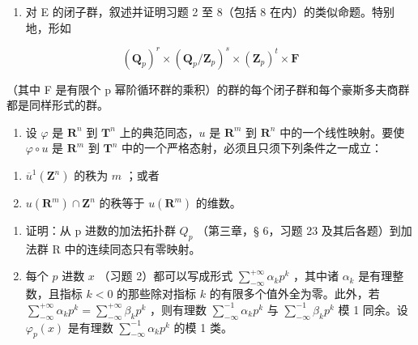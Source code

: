 \begin{enumerate}
\def\labelenumi{\alph{enumi})}
\setcounter{enumi}{6}
\tightlist
\item
  对 E 的闭子群，叙述并证明习题 2 至 8（包括 8 在内）的类似命题。特别地，形如
\end{enumerate}

\[
(\mathbf {Q} _ {p}) ^ {r} \times (\mathbf {Q} _ {p} / \mathbf {Z} _ {p}) ^ {s} \times (\mathbf {Z} _ {p}) ^ {t} \times \mathbf {F}
\]

（其中 F 是有限个 p 幂阶循环群的乘积）的群的每个闭子群和每个豪斯多夫商群都是同样形式的群。

\ExerciseSection

\begin{enumerate}
\def\labelenumi{\arabic{enumi})}
\tightlist
\item
  设 \(\varphi\) 是 \(\mathbf{R}^n\) 到 \(\mathbf{T}^n\) 上的典范同态，\(u\) 是 \(\mathbf{R}^m\) 到 \(\mathbf{R}^n\) 中的一个线性映射。要使 \(\varphi \circ u\) 是 \(\mathbf{R}^m\) 到 \(\mathbf{T}^n\) 中的一个严格态射，必须且只须下列条件之一成立：
\end{enumerate}

\begin{enumerate}
\def\labelenumi{\alph{enumi})}
\item
  \(\overline{u}^1 (\mathbf{Z}^n)\) 的秩为 \(m\) ；或者
\item
  \(u(\mathbf{R}^m)\cap \mathbf{Z}^n\) 的秩等于 \(u(\mathbf{R}^m)\) 的维数。
\end{enumerate}

\begin{enumerate}
\def\labelenumi{\arabic{enumi})}
\setcounter{enumi}{1}
\item
  证明：从 p 进数的加法拓扑群 \(Q_{p}\) （第三章，§ 6，习题 23 及其后各题）到加法群 R 中的连续同态只有零映射。
\item
  每个 \(p\) 进数 \(x\) （习题 2）都可以写成形式 \(\sum_{-\infty}^{+\infty} \alpha_k p^k\) ，其中诸 \(\alpha_k\) 是有理整数，且指标 \(k < 0\) 的那些除对指标 \(k\) 的有限多个值外全为零。此外，若 \(\sum_{-\infty}^{+\infty} \alpha_k p^k = \sum_{-\infty}^{+\infty} \beta_k p^k\) ，则有理数 \(\sum_{-\infty}^{-1} \alpha_k p^k\) 与 \(\sum_{-\infty}^{-1} \beta_k p^k\) 模 1 同余。设 \(\varphi_p(x)\) 是有理数 \(\sum_{-\infty}^{-1} \alpha_k p^k\) 的模 1 类。\\
\end{enumerate}


